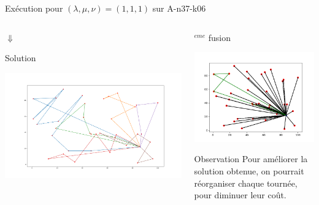 \documentclass{beamer}
\begin{document}
\begin{frame}{Exécution pour $(\lambda,\mu,\nu) = (1,1,1)$ sur A-n37-k06}
\begin{columns}[t]
\begin{column}{4cm}
 	 \centering
 $\Downarrow$
 
 Solution
 
 \includegraphics[scale=0.09]{resCW101010.png}
  \end{column}


  \begin{column}{4cm}
  	$^{eme}$ fusion
  	
	\includegraphics[scale=0.25]{CW2.png}
 	
	
	\begin{block}{Observation}
	Pour améliorer la solution obtenue, on pourrait réorganiser chaque tournée, pour diminuer leur coût.
	\end{block}
  \end{column}
 \end{columns}
 
 


\end{frame}
\end{document}
